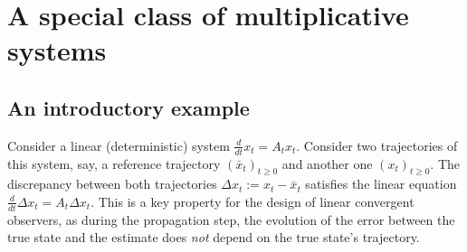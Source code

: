 \documentclass[a4paper,12pt,onecolumn]{article}
\newcommand{\dotex}{{\frac{d}{dt}}}
\begin{document}
 















\section{A special class of multiplicative systems}
\label{sect::deterministic}

\subsection{An introductory example}\label{introd:ex}

Consider a linear (deterministic) system $\dotex x_t=A_tx_t$. Consider two trajectories of this system, say, a reference trajectory  $(\bar x_t)_{t\geq 0}$ and another one $(x_t)_{t\geq 0}$. The  discrepancy between both trajectories $\Delta x_t:=x_t-\bar x_t$ satisfies the linear equation $\dotex \Delta x_t=A_t \Delta x_t$.  This is a key property for the design of linear convergent observers, as during the propagation step, the evolution of the error between the true state and the estimate does \emph{not} depend on the true state's trajectory. 
\end{document}
